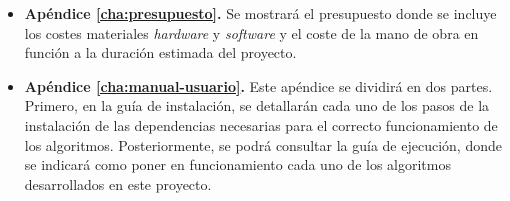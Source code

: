 \begin{itemize}
    \item \textbf{Apéndice \ref{cha:presupuesto}.} Se mostrará el presupuesto donde se incluye los costes materiales \textit{hardware} y \textit{software} y el coste de la mano de obra en función a la duración estimada del proyecto.
    \item \textbf{Apéndice \ref{cha:manual-usuario}.} Este apéndice se dividirá en dos partes. Primero, en la guía de instalación, se detallarán cada uno de los pasos de la instalación de las dependencias necesarias para el correcto funcionamiento de los algoritmos. Posteriormente, se podrá consultar la guía de ejecución, donde se indicará como poner en funcionamiento cada uno de los algoritmos desarrollados en este proyecto.
\end{itemize}




